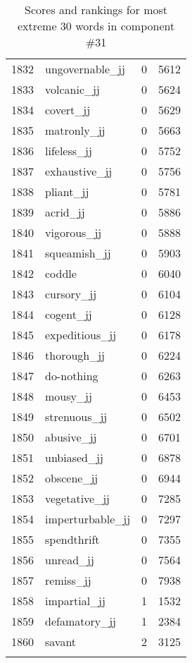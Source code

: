\begin{longtable}[!htbp]{| rlr@{.}l |}
    1832 & ungovernable\_jj & 0 & 5612 \\
    1833 & volcanic\_jj & 0 & 5624 \\
    1834 & covert\_jj & 0 & 5629 \\
    1835 & matronly\_jj & 0 & 5663 \\
    1836 & lifeless\_jj & 0 & 5752 \\
    1837 & exhaustive\_jj & 0 & 5756 \\
    1838 & pliant\_jj & 0 & 5781 \\
    1839 & acrid\_jj & 0 & 5886 \\
    1840 & vigorous\_jj & 0 & 5888 \\
    1841 & squeamish\_jj & 0 & 5903 \\
    1842 & coddle & 0 & 6040 \\
    1843 & cursory\_jj & 0 & 6104 \\
    1844 & cogent\_jj & 0 & 6128 \\
    1845 & expeditious\_jj & 0 & 6178 \\
    1846 & thorough\_jj & 0 & 6224 \\
    1847 & do-nothing & 0 & 6263 \\
    1848 & mousy\_jj & 0 & 6453 \\
    1849 & strenuous\_jj & 0 & 6502 \\
    1850 & abusive\_jj & 0 & 6701 \\
    1851 & unbiased\_jj & 0 & 6878 \\
    1852 & obscene\_jj & 0 & 6944 \\
    1853 & vegetative\_jj & 0 & 7285 \\
    1854 & imperturbable\_jj & 0 & 7297 \\
    1855 & spendthrift & 0 & 7355 \\
    1856 & unread\_jj & 0 & 7564 \\
    1857 & remiss\_jj & 0 & 7938 \\
    1858 & impartial\_jj & 1 & 1532 \\
    1859 & defamatory\_jj & 1 & 2384 \\
    1860 & savant & 2 & 3125 \\
    \hline
    \caption{Scores and rankings for most extreme 30 words in component \#31} \\
\end{longtable}
